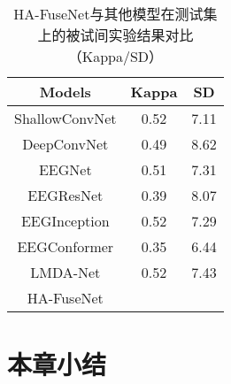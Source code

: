 \begin{table}[ht]
    \centering
    \caption{HA-FuseNet与其他模型在测试集上的被试间实验结果对比（Kappa/SD）}
    \label{tab:2bcomparecrosssd}
    \begin{tabularx}{\textwidth}{CCC}
      \toprule
      Models & Kappa & SD \\
      \midrule
      ShallowConvNet\cite{schirrmeister2017deep} &0.52&7.11\\
      DeepConvNet\cite{schirrmeister2017deep} &0.49& 8.62 \\
      EEGNet\cite{lawhern2018eegnet} &0.51& 7.31\\
      EEGResNet\cite{HBM:HBM23730} &0.39 &8.07\\
      EEGInception\cite{zhang2021eeg} & 0.52 &7.29 \\
      EEGConformer\cite{song2022eeg} &0.35 &6.44\\
      LMDA-Net\cite{miao2023lmda} &0.52&7.43\\
      \midrule 
      HA-FuseNet \\
      \bottomrule
    \end{tabularx}
\end{table}

\section{本章小结}

